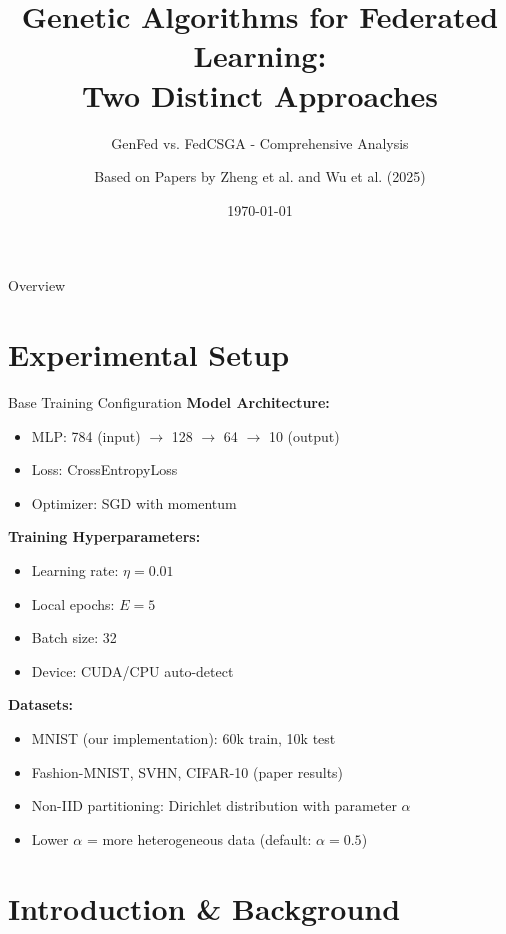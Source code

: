 \documentclass{beamer}
\title{Genetic Algorithms for Federated Learning:\\Two Distinct Approaches}
\subtitle{GenFed vs. FedCSGA - Comprehensive Analysis}
\author{Based on Papers by Zheng et al. and Wu et al. (2025)}
\institute{CS6007 Project}
\date{\today}
\begin{document}
\begin{frame}
\titlepage
\end{frame}

\begin{frame}{Overview}
\tableofcontents
\end{frame}

\section{Experimental Setup}

\begin{frame}{Base Training Configuration}
\textbf{Model Architecture:}
\begin{itemize}
\item MLP: 784 (input) $\to$ 128 $\to$ 64 $\to$ 10 (output)
\item Loss: CrossEntropyLoss
\item Optimizer: SGD with momentum
\end{itemize}

\textbf{Training Hyperparameters:}
\begin{itemize}
\item Learning rate: $\eta = 0.01$
\item Local epochs: $E = 5$
\item Batch size: 32
\item Device: CUDA/CPU auto-detect
\end{itemize}

\textbf{Datasets:}
\begin{itemize}
\item MNIST (our implementation): 60k train, 10k test
\item Fashion-MNIST, SVHN, CIFAR-10 (paper results)
\item Non-IID partitioning: Dirichlet distribution with parameter $\alpha$
\item Lower $\alpha$ = more heterogeneous data (default: $\alpha = 0.5$)
\end{itemize}
\end{frame}

\section{Introduction \& Background}
\end{document}
